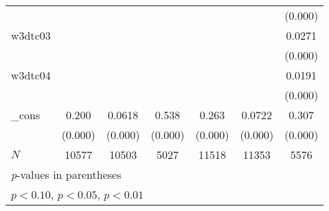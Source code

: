 {\begin{tabular}{l*{6}{c}}
            &                     &                     &                     &                     &                     &     (0.000)         \\
[1em]
w3dtc03     &                     &                     &                     &                     &                     &      0.0271\sym{***}\\
            &                     &                     &                     &                     &                     &     (0.000)         \\
[1em]
w3dtc04     &                     &                     &                     &                     &                     &      0.0191\sym{***}\\
            &                     &                     &                     &                     &                     &     (0.000)         \\
[1em]
\_cons      &       0.200\sym{***}&      0.0618\sym{***}&       0.538\sym{***}&       0.263\sym{***}&      0.0722\sym{***}&       0.307\sym{***}\\
            &     (0.000)         &     (0.000)         &     (0.000)         &     (0.000)         &     (0.000)         &     (0.000)         \\
\hline
\(N\)       &       10577         &       10503         &        5027         &       11518         &       11353         &        5576         \\
\hline\hline
\multicolumn{7}{l}{\footnotesize \textit{p}-values in parentheses}\\
\multicolumn{7}{l}{\footnotesize \sym{*} \(p<0.10\), \sym{**} \(p<0.05\), \sym{***} \(p<0.01\)}\\
\end{tabular}
}
